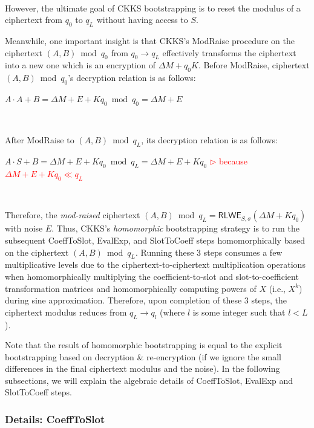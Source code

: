 $ $

However, the ultimate goal of CKKS bootstrapping is to reset the modulus of a ciphertext from $q_0$ to $q_L$ without having access to $S$.

Meanwhile, one important insight is that CKKS's \textsf{ModRaise} procedure on the ciphertext $(A, B) \bmod q_0$ from $q_0 \rightarrow q_L$ effectively transforms the ciphertext into a new one which is an encryption of $\Delta M + q_0K$. Before \textsf{ModRaise}, ciphertext $(A, B) \bmod q_0$'s decryption relation is as follows:

$A\cdot A + B = \Delta M + E + Kq_0 \bmod q_0 = \Delta M + E$ 

$ $

After \textsf{ModRaise} to $(A, B) \bmod q_L$, its decryption relation is as follows:

$A\cdot S + B = \Delta M + E + Kq_0 \bmod q_L = \Delta M + E + Kq_0$ \textcolor{red}{ $\rhd$ because $\Delta M + E + Kq_0 \ll q_L$}

$ $

Therefore, the \textit{mod-raised} ciphertext $(A, B) \bmod q_L = \textsf{RLWE}_{S, \sigma}(\Delta M + Kq_0)$ with noise $E$. Thus, CKKS's \textit{homomorphic} bootstrapping strategy is to run the subsequent \textsf{CoeffToSlot}, \textsf{EvalExp}, and \textsf{SlotToCoeff} steps \textsf{homomorphically} based on the ciphertext $(A, B) \bmod q_L$. Running these 3 steps consumes a few multiplicative levels due to the ciphertext-to-ciphertext multiplication operations when homomorphically multiplying the coefficient-to-slot and slot-to-coefficient transformation matrices and homomorphically computing powers of $X$ (i.e., $X^k$) during sine approximation. Therefore, upon completion of these 3 steps, the ciphertext modulus reduces from $q_L \rightarrow q_l$ (where $l$ is some integer such that $l < L$).


Note that the result of homomorphic bootstrapping is equal to the explicit bootstrapping based on decryption \& re-encryption (if we ignore the small differences in the final ciphertext modulus and the noise). In the following subsections, we will explain the algebraic details of \textsf{CoeffToSlot}, \textsf{EvalExp} and \textsf{SlotToCoeff} steps. 

\subsubsection{Details: \textsf{CoeffToSlot}}
\label{subsubsec:ckks-bootstrapping-coefftoslot-details}

